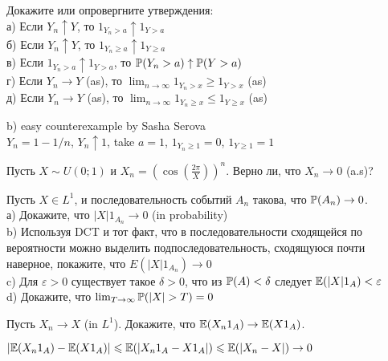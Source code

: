 \begin{problem}
Докажите или опровергните утверждения: \\
а) Если $Y_{n}\uparrow Y$, то $1_{Y_{n}>a}\uparrow 1_{Y>a}$ \\
б) Если $Y_{n}\uparrow Y$, то $1_{Y_{n}\ge a}\uparrow 1_{Y\ge a}$ \\
в) Если $1_{Y_{n}>a}\uparrow 1_{Y>a}$, то $\P(Y_{n}>a)\uparrow
\P(Y>a)$ \\
г) Если $Y_{n}\rightarrow Y$ (as), то
$\lim_{n\to\infty}1_{Y_{n}>x}\ge 1_{Y>x}$ (as) \\
д) Если $Y_{n}\rightarrow Y$ (as), то
$\lim_{n\to\infty}1_{Y_{n}\ge x}\le 1_{Y\ge x}$ (as) 
\end{problem} 
\begin{solution} 

b) easy counterexample by Sasha Serova \\
$Y_{n}=1-1/n$, $Y_{n}\uparrow 1$, take $a=1$, $1_{Y_{n}\ge 1}=0$,
$1_{Y\ge 1}=1$ 
\end{solution}

\begin{problem}
Пусть $X\sim U(0;1)$ и $X_{n}=(\cos(\frac{2\pi}{X}))^{n}$. Верно
ли, что
$X_{n}\rightarrow 0$ (a.s)?
\end{problem} 
\begin{solution} 

\end{solution}

\begin{problem}
Пусть $X\in L^{1}$, и последовательность событий $A_{n}$ такова,
что $\P(A_{n})\rightarrow 0$. \\
а) Докажите, что $|X| 1_{A_{n}} \rightarrow 0$ (in probability) \\
b) Используя DCT и тот факт, что в последовательности сходящейся
по вероятности можно выделить подпоследовательность, сходящуюся
почти наверное, покажите, что $E\left(|X| 1_{A_{n}}\right)
\rightarrow 0$
\\
c) Для $\varepsilon>0$ существует такое $\delta>0$,
что из $\P(A)<\delta$ следует $\E(|X|1_{A})<\varepsilon$ \\
d) Докажите, что $\lim_{T\to\infty}\P(|X|>T)=0$ 
\end{problem} 
\begin{solution} 

\end{solution}

\begin{problem}
Пусть $X_{n}\rightarrow X$ (in $L^{1}$). Докажите, что
$\E(X_{n}1_{A})\rightarrow \E(X 1_{A})$. 
\end{problem} 
\begin{solution} 

$|\E(X_{n}1_{A})-\E(X 1_{A})|\le \E(|X_{n}1_{A}-X 1_{A}|)\le
\E(|X_{n}-X|)\rightarrow 0$ 
\end{solution}

